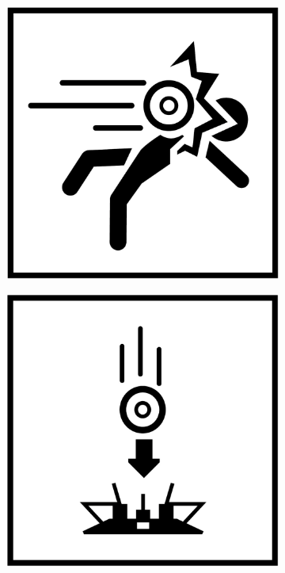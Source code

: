 \begin{figure}[H]
\begin{subfigure}[l]{0.195\linewidth}
  \end{subfigure}
  \begin{subfigure}[l]{0.195\linewidth}
    \includegraphics[width=\textwidth]{Sources/PortalIcons/3.jpg}
  \end{subfigure}
  \begin{subfigure}[l]{0.195\linewidth}
    \includegraphics[width=\textwidth]{Sources/PortalIcons/4.jpg}

\end{subfigure}
\end{figure}
